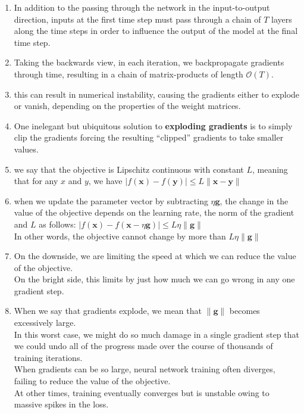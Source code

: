 \begin{enumerate}
    \item In addition to the passing through the network in the input-to-output direction, inputs at the first time step must pass through a chain of $T$ layers along the time steps in order to influence the output of the model at the final time step. 
    
    \item Taking the backwards view, in each iteration, we backpropagate gradients through time, resulting in a chain of matrix-products of length $\mathcal{O}(T)$. 

    \item this can result in numerical instability, causing the gradients either to explode or vanish, depending on the properties of the weight matrices.

    \item One inelegant but ubiquitous solution to \textbf{exploding gradients} is to simply clip the gradients forcing the resulting “clipped” gradients to take smaller values.

    \item we say that the objective is Lipschitz continuous with constant $L$, meaning that for any $x$ and $y$, we have $|f(\mathbf{x}) - f(\mathbf{y})| \leq L \|\mathbf{x} - \mathbf{y}\|$

    \item when we update the parameter vector by subtracting $\eta \mathbf{g}$, the change in the value of the objective depends on the learning rate, the norm of the gradient and $L$ as follows: $|f(\mathbf{x}) - f(\mathbf{x} - \eta\mathbf{g})| \leq L \eta\|\mathbf{g}\|$\\
    In other words, the objective cannot change by more than $L \eta \|\mathbf{g}\|$\\
    
    \item On the downside, we are limiting the speed at which we can reduce the value of the objective.\\
    On the bright side, this limits by just how much we can go wrong in any one gradient step.

    \item When we say that gradients explode, we mean that $\|\mathbf{g}\|$ becomes excessively large.\\
    In this worst case, we might do so much damage in a single gradient step that we could undo all of the progress made over the course of thousands of training iterations.\\
    When gradients can be so large, neural network training often diverges, failing to reduce the value of the objective.\\
    At other times, training eventually converges but is unstable owing to massive spikes in the loss.


\end{enumerate}
